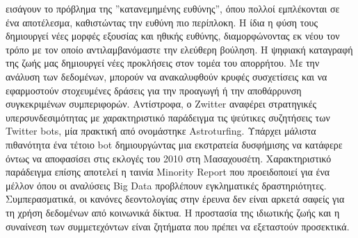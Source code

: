 \documentclass{report}
\begin{document}
εισάγουν το πρόβλημα της ''κατανεμημένης ευθύνης'', όπου πολλοί εμπλέκονται σε ένα αποτέλεσμα, καθιστώντας την ευθύνη πιο περίπλοκη. Η ίδια η φύση τους δημιουργεί νέες
μορφές εξουσίας και ηθικής ευθύνης, διαμορφώνοντας εκ νέου τον τρόπο με τον οποίο αντιλαμβανόμαστε την ελεύθερη βούληση.
Η ψηφιακή καταγραφή της ζωής μας δημιουργεί νέες προκλήσεις στον τομέα του απορρήτου. Με την ανάλυση των δεδομένων, μπορούν να ανακαλυφθούν κρυφές συσχετίσεις και να εφαρμοστούν στοχευμένες δράσεις για την προαγωγή ή την αποθάρρυνση συγκεκριμένων συμπεριφορών. Αντίστροφα, ο Zwitter αναφέρει στρατηγικές υπερσυνδεσιμότητας με χαρακτηριστικό παράδειγμα τις ψεύτικες συζητήσεις των Twitter bots, μία πρακτική από ονομάστηκε Astroturfing. Υπάρχει μάλιστα πιθανότητα ένα τέτοιο bot δημιουργώντας μια εκστρατεία δυσφήμισης να κατάφερε όντως
να αποφασίσει στις εκλογές του 2010 στη Μασαχουσέτη.
Χαρακτηριστικό παράδειγμα επίσης αποτελεί η ταινία Minority Report που προειδοποιεί για ένα μέλλον όπου οι αναλύσεις Big Data προβλέπουν εγκληματικές δραστηριότητες. Συμπερασματικά, οι κανόνες δεοντολογίας στην έρευνα δεν είναι αρκετά σαφείς για τη χρήση δεδομένων από κοινωνικά δίκτυα. Η προστασία της ιδιωτικής ζωής και η συναίνεση των συμμετεχόντων είναι ζητήματα που πρέπει να εξεταστούν προσεκτικά.
\end{document}
